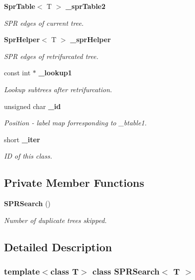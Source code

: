 \begin{CompactItemize}
{\bf Spr\-Table}$<$ T $>$ {\bf \_\-spr\-Table2}
\begin{CompactList}\small\item\em SPR edges of current tree. \item\end{CompactList}\item 
{\bf Spr\-Helper}$<$ T $>$ {\bf \_\-spr\-Helper}
\begin{CompactList}\small\item\em SPR edges of retrifurcated tree. \item\end{CompactList}\item 
const int $\ast$ {\bf \_\-lookup1}
\begin{CompactList}\small\item\em Lookup subtrees after retrifurcation. \item\end{CompactList}\item 
unsigned char {\bf \_\-id}
\begin{CompactList}\small\item\em Position - label map forresponding to \_\-btable1. \item\end{CompactList}\item 
short {\bf \_\-iter}
\begin{CompactList}\small\item\em ID of this class. \item\end{CompactList}\end{CompactItemize}
\subsection*{Private Member Functions}
\begin{CompactItemize}
\item 
{\bf SPRSearch} ()
\begin{CompactList}\small\item\em Number of duplicate trees skipped. \item\end{CompactList}\end{CompactItemize}


\subsection{Detailed Description}
\subsubsection*{template$<$class T$>$ class SPRSearch$<$ T $>$}

